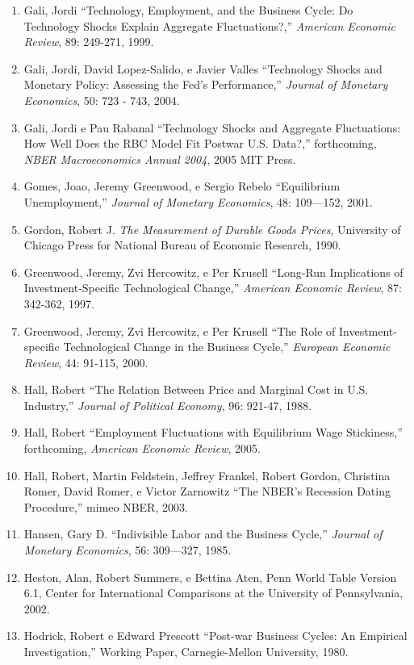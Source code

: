 \documentclass[12pt]{article}
\begin{document}
\begin{enumerate}
    \item Gali, Jordi “Technology, Employment, and the Business Cycle: Do Technology Shocks Explain Aggregate Fluctuations?,” \textit{American Economic Review}, 89: 249-271, 1999.
    \item Gali, Jordi, David Lopez-Salido, e Javier Valles “Technology Shocks and Monetary Policy: Assessing the Fed’s Performance,” \textit{Journal of Monetary Economics}, 50: 723 - 743, 2004.
    \item Gali, Jordi e Pau Rabanal “Technology Shocks and Aggregate Fluctuations: How Well Does the RBC Model Fit Postwar U.S. Data?,” forthcoming, \textit{NBER Macroeconomics Annual 2004}, 2005 MIT Press.
    \item Gomes, Joao, Jeremy Greenwood, e Sergio Rebelo “Equilibrium Unemployment,” \textit{Journal of Monetary Economics}, 48: 109—152, 2001.
    \item Gordon, Robert J. \textit{The Measurement of Durable Goods Prices}, University of Chicago Press for National Bureau of Economic Research, 1990.
    \item Greenwood, Jeremy, Zvi Hercowitz, e Per Krusell “Long-Run Implications of Investment-Specific Technological Change,” \textit{American Economic Review}, 87: 342-362, 1997.
    \item Greenwood, Jeremy, Zvi Hercowitz, e Per Krusell “The Role of Investment-specific Technological Change in the Business Cycle,” \textit{European Economic Review}, 44: 91-115, 2000.
    \item Hall, Robert “The Relation Between Price and Marginal Cost in U.S. Industry,” \textit{Journal of Political Economy}, 96: 921-47, 1988.
    \item Hall, Robert “Employment Fluctuations with Equilibrium Wage Stickiness,” forthcoming, \textit{American Economic Review}, 2005.
    \item Hall, Robert, Martin Feldstein, Jeffrey Frankel, Robert Gordon, Christina Romer, David Romer, e Victor Zarnowitz “The NBER’s Recession Dating Procedure,” mimeo NBER, 2003.
    \item Hansen, Gary D. “Indivisible Labor and the Business Cycle,” \textit{Journal of Monetary Economics}, 56: 309—327, 1985.
    \item Heston, Alan, Robert Summers, e Bettina Aten, Penn World Table Version 6.1, Center for International Comparisons at the University of Pennsylvania, 2002.
    \item Hodrick, Robert e Edward Prescott “Post-war Business Cycles: An Empirical Investigation,” Working Paper, Carnegie-Mellon University, 1980.

\end{enumerate}
\end{document}
